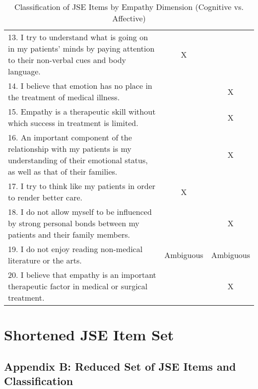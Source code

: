 \begin{table}[H]
\begin{tabular}{p{11cm}cc}
13. I try to understand what is going on in my patients’ minds by paying attention to their non-verbal cues and body language. & X & \\
14. I believe that emotion has no place in the treatment of medical illness. &  & X \\
15. Empathy is a therapeutic skill without which success in treatment is limited. &  & X \\
16. An important component of the relationship with my patients is my understanding of their emotional status, as well as that of their families. &  & X \\
17. I try to think like my patients in order to render better care. & X & \\
18. I do not allow myself to be influenced by strong personal bonds between my patients and their family members. &  & X \\
19. I do not enjoy reading non-medical literature or the arts. & Ambiguous & Ambiguous \\
20. I believe that empathy is an important therapeutic factor in medical or surgical treatment. &  & X \\
\bottomrule
\end{tabular}
\caption{Classification of JSE Items by Empathy Dimension (Cognitive vs. Affective)}
\label{tab:jse_classification}
\end{table}


\chapter{Shortened JSE Item Set}
\label{app:jse-short}

\section*{Appendix B: Reduced Set of JSE Items and Classification}


